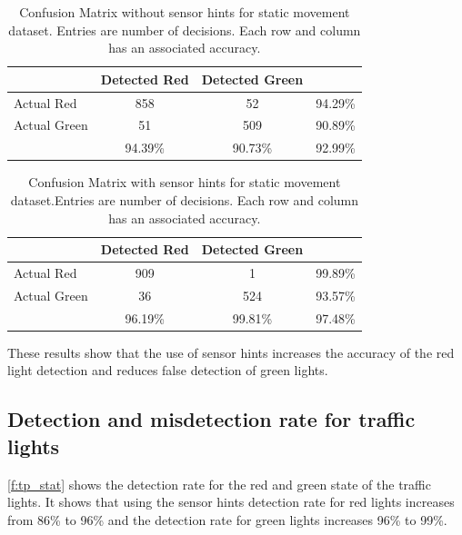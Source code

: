 \begin{table}[h!]
  \centering
  \caption{Confusion Matrix without sensor hints for static movement dataset. Entries are number of decisions. Each row and column has an associated accuracy.}
  \label{t:con_nocrp}
  \begin{tabular}{  l | c | c | r }
   
     & Detected Red & Detected Green &  \\
    \hline
    Actual Red & 858 & 52 & 94.29\% \\
    \hline
    Actual Green & 51 & 509 & 90.89\% \\
    \hline
    & 94.39\% & 90.73\% & 92.99\% \\
    
  \end{tabular}
\end{table}

\begin{table}[h!]
  \centering
  \caption{Confusion Matrix with sensor hints for static movement dataset.Entries are number of decisions. Each row and column has an associated accuracy.}
  \label{t:con_crp}
  \begin{tabular}{  l | c | c | r }
   
     & Detected Red & Detected Green &  \\
    \hline
    Actual Red & 909 & 1 & 99.89\% \\
    \hline
    Actual Green & 36 & 524 & 93.57\% \\
    \hline
    & 96.19\% & 99.81\% & 97.48\% \\
    
  \end{tabular}
\end{table}

These results show that the use of sensor hints increases the accuracy of the red light detection and reduces false detection of green lights.


\subsection{Detection and misdetection rate for traffic lights}
\ref{f:tp_stat} shows the detection rate for the red and green state of the traffic lights.
It shows that using the sensor hints detection rate for red lights increases from 86\% to 96\% and the detection rate for green lights increases 96\% to 99\%.

